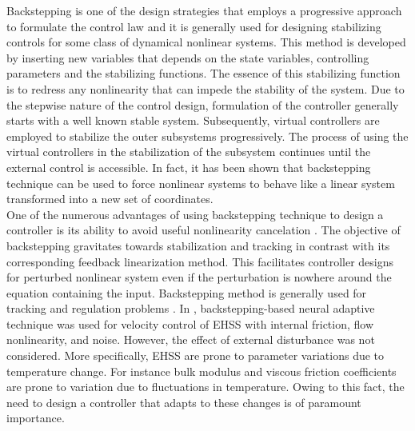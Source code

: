 \documentclass{article} %
\begin{document}
Backstepping is one of the design strategies that employs a progressive approach to formulate the control law \cite{rozali2013asymptotic} and it is generally used for designing stabilizing controls for some class of dynamical nonlinear systems. This method is developed by inserting new variables that depends on the state variables, controlling parameters and the stabilizing functions. The essence of this stabilizing function is to redress any nonlinearity that can impede the stability of the system. Due to the stepwise nature of the control design, formulation of the controller generally starts with a well known stable system. Subsequently, virtual controllers are employed to stabilize the outer subsystems progressively. The process of using the virtual controllers in the stabilization of the subsystem continues until the external control is accessible. In fact, it has been shown that backstepping technique can be used to force nonlinear systems to behave like a linear system transformed into a new set of coordinates.\\
\indent
One of the numerous advantages of using backstepping technique to design a controller is its ability to avoid useful nonlinearity cancelation \cite{ayinde2015backstepping,el2015backstepping}. The objective of backstepping gravitates towards stabilization and tracking in contrast with its corresponding feedback linearization method. This facilitates controller designs for perturbed nonlinear system even if the perturbation is nowhere around the equation containing the input. Backstepping method is generally used for tracking and regulation problems \cite{rozali2013asymptotic}. In \cite{dashti2014neural}, backstepping-based neural adaptive technique was used for velocity control of EHSS with internal friction, flow nonlinearity, and noise. However, the effect of external disturbance was not considered. More specifically, EHSS are prone to parameter variations due to temperature change. For instance bulk modulus and viscous friction coefficients are prone to variation due to fluctuations in temperature. Owing to this fact, the need to design a controller that adapts to these changes is of paramount importance.\\
\indent
\end{document}
